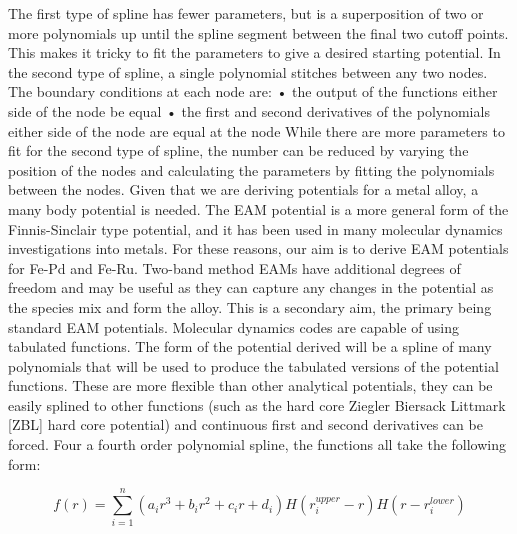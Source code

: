 The first type of spline has fewer parameters, but is a superposition of two or more polynomials up until the spline segment between the final two cutoff points.  This makes it tricky to fit the parameters to give a desired starting potential.  In the second type of spline, a single polynomial stitches between any two nodes.  The boundary conditions at each node are:
•	the output of the functions either side of the node be equal
•	the first and second derivatives of the polynomials either side of the node are equal at the node
While there are more parameters to fit for the second type of spline, the number can be reduced by varying the position of the nodes and calculating the parameters by fitting the polynomials between the nodes.
Given that we are deriving potentials for a metal alloy, a many body potential is needed.  The EAM potential is a more general form of the Finnis-Sinclair type potential, and it has been used in many molecular dynamics investigations into metals.  For these reasons, our aim is to derive EAM potentials for Fe-Pd and Fe-Ru.
Two-band method EAMs have additional degrees of freedom and may be useful as they can capture any changes in the potential as the species mix and form the alloy.  This is a secondary aim, the primary being standard EAM potentials.
Molecular dynamics codes are capable of using tabulated functions.  The form of the potential derived will be a spline of many polynomials that will be used to produce the tabulated versions of the potential functions.  These are more flexible than other analytical potentials, they can be easily splined to other functions (such as the hard core Ziegler Biersack Littmark [ZBL] hard core potential) and continuous first and second derivatives can be forced.
Four a fourth order polynomial spline, the functions all take the following form:

\begin{equation}
f(r) = \sum \limits_{i=1}^{n} (a_{i}r^{3}+b_{i}r^{2}+c_{i}r+d_{i}) H(r_{i}^{upper}-r)H(r-r_{i}^{lower})
\end{equation}


